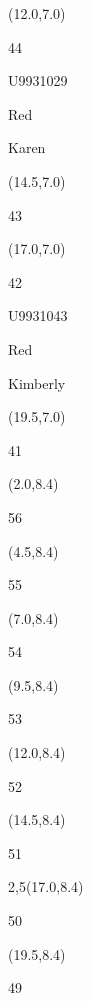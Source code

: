 \documentclass[a4paper]{article}
\newcommand{\myseat}[4]{%
\vspace{-0.1cm} \hspace{-0.5cm}
\parbox[t][2.2cm][t]{3.5cm}{%
\small #1 %
\begin{description}
\vspace{-0.1cm}
\item [ID:] #2
\vspace{-0.1cm}
\item [Team:] #3 \normalsize
\vspace{-0.1cm}
\item \normalsize #4
\vspace{-0.1cm}
\end{description}
}
}
\begin{document}
\begin{textblock}{2.5}(12.0,7.0)
\myseat{44}{U9931029}{Red}{Karen}
\end{textblock}

\begin{textblock}{2.5}(14.5,7.0)
\textblockcolor{}
\myseat{43}{}{}{}
\end{textblock}

\begin{textblock}{2.5}(17.0,7.0)
\myseat{42}{U9931043}{Red}{Kimberly}
\end{textblock}

\begin{textblock}{2.5}(19.5,7.0)
\textblockcolor{}
\myseat{41}{}{}{}
\end{textblock}


\begin{textblock}{2.5}(2.0,8.4)
\textblockcolor{}
\myseat{56}{}{}{}
\end{textblock}

\begin{textblock}{2.5}(4.5,8.4)
\textblockcolor{}
\myseat{55}{}{}{}
\end{textblock}

\begin{textblock}{2.5}(7.0,8.4)
\textblockcolor{}
\myseat{54}{}{}{}
\end{textblock}

\begin{textblock}{2.5}(9.5,8.4)
\textblockcolor{}
\myseat{53}{}{}{}
\end{textblock}

\begin{textblock}{2.5}(12.0,8.4)
\textblockcolor{}
\myseat{52}{}{}{}
\end{textblock}

\begin{textblock}{2.5}(14.5,8.4)
\textblockcolor{}
\myseat{51}{}{}{}
\end{textblock}

\begin{textblock}{2,5}(17.0,8.4)
\textblockcolor{}
\myseat{50}{}{}{}
\end{textblock}

\begin{textblock}{2.5}(19.5,8.4)
\textblockcolor{}
\myseat{49}{}{}{}
\end{textblock}
\end{document}
